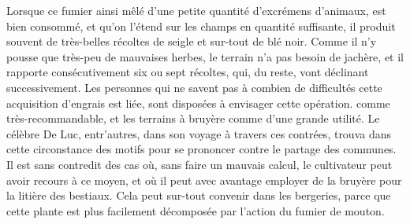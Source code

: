 Lorsque ce fumier ainsi mêlé d'une petite quantité d'excrémens d'animaux, est bien consommé, et qu'on l'étend sur les champs en quantité suffisante, il produit souvent de très-belles récoltes de seigle et sur-tout de blé noir. Comme il n'y pousse que très-peu de mauvaises herbes, le terrain n'a pas besoin de jachère, et il rapporte consécutivement six ou sept récoltes, qui, du reste, vont déclinant successivement. Les personnes qui ne savent pas à combien de difficultés cette acquisition d'engrais est liée, sont disposées à envisager cette opération.\setcounter{page}{66} comme très-recommandable, et les terrains à bruyère comme d'une grande utilité. Le célèbre De Luc, entr'autres, dans son voyage à travers ces contrées, trouva dans cette circonstance des motifs pour se prononcer contre le partage des communes. Il est sans contredit des cas où, sans faire un mauvais calcul, le cultivateur peut avoir recours à ce moyen, et où il peut avec avantage employer de la bruyère pour la litière des bestiaux. Cela peut sur-tout convenir dans les bergeries, parce que cette plante est plus facilement décomposée par l'action du fumier de mouton.
